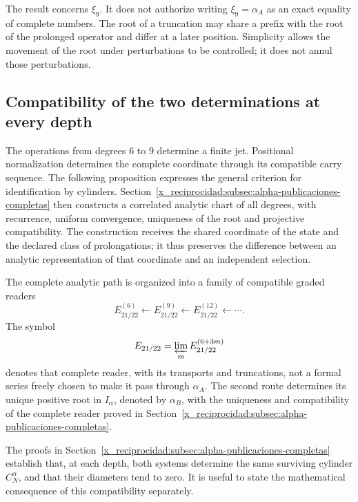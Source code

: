 The result concerns \(\xi_9\). It does not authorize writing
\(\xi_9=\alpha_A\) as an exact equality of complete numbers.
The root of a truncation may share a prefix with the root of the
prolonged operator and differ at a later position. Simplicity
allows the movement of the root under perturbations to be controlled; it does not
annul those perturbations.

\subsection{Compatibility of the two determinations at every depth}
\label{x_reciprocidad:subsec:alpha-limite-dos-vias}

\begin{remark}
The operations from degrees \(6\) to \(9\) determine a finite jet.
Positional normalization determines the complete coordinate through
its compatible carry sequence. The following proposition expresses
the general criterion for identification by cylinders.
Section~\ref{x_reciprocidad:subsec:alpha-publicaciones-completas} then constructs
a correlated analytic chart of all degrees, with recurrence,
uniform convergence, uniqueness of the root and projective compatibility.
The construction receives the shared coordinate of the state and the declared class
of prolongations; it thus preserves the difference between an
analytic representation of that coordinate and an independent selection.
\end{remark}

The complete analytic path is organized into a family of compatible graded
readers
\[
 E_{21/22}^{(6)}\longleftarrow E_{21/22}^{(9)}
 \longleftarrow E_{21/22}^{(12)}\longleftarrow\cdots.
\]
The symbol
\[
 E_{21/22}=\varprojlim_m E_{21/22}^{(6+3m)}
\]
denotes that complete reader, with its transports and truncations, not a
formal series freely chosen to make it pass through \(\alpha_A\).
The second route determines its unique positive root in \(I_\alpha\),
denoted by \(\alpha_B\), with the uniqueness and compatibility of the
complete reader proved in Section~\ref{x_reciprocidad:subsec:alpha-publicaciones-completas}.

The proofs in Section~\ref{x_reciprocidad:subsec:alpha-publicaciones-completas}
establish that, at each depth, both systems determine the same
surviving cylinder \(C_N^\alpha\), and that their diameters tend to
zero. It is useful to state the mathematical consequence of this
compatibility separately.

